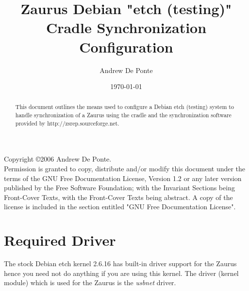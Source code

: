 \documentclass{article}
\title{Zaurus Debian "etch (testing)" Cradle Synchronization Configuration}
\author{Andrew De Ponte}
\date{\today}
\begin{document}
\maketitle

\newpage

\begin{abstract}
This document outlines the means used to configure a Debian etch
(testing) system to handle synchronization of a Zaurus using the cradle
and the synchronization software provided by
http://zsrep.sourceforge.net.
\end{abstract}

\newpage

\noindent Copyright \copyright 2006 Andrew De Ponte.\\
Permission is granted to copy, distribute and/or modify this document under
the terms of the GNU Free Documentation License, Version 1.2 or any later
version published by the Free Software Foundation; with the Invariant
Sections being Front-Cover Texts, with the Front-Cover  Texts being
abstract. A copy of the license is included in the section entitled "GNU
Free Documentation License".

\newpage

\tableofcontents

\newpage


\section{Required Driver}

The stock Debian etch kernel 2.6.16 has built-in driver support for the
Zaurus hence you need not do anything if you are using this kernel.  The
driver (kernel module) which is used for the Zaurus is the \emph{usbnet}
driver.
\end{document}
